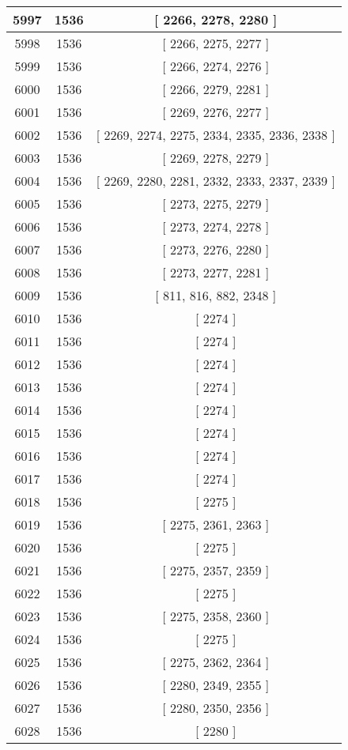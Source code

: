\begin{center}
\begin{longtable}[H]{|| c c c ||}
\hline
5997 & 1536 & [ 2266, 2278, 2280 ] \\ 
\hline
5998 & 1536 & [ 2266, 2275, 2277 ] \\ 
\hline
5999 & 1536 & [ 2266, 2274, 2276 ] \\ 
\hline
6000 & 1536 & [ 2266, 2279, 2281 ] \\ 
\hline
6001 & 1536 & [ 2269, 2276, 2277 ] \\ 
\hline
6002 & 1536 & [ 2269, 2274, 2275, 2334, 2335, 2336, 2338 ] \\ 
\hline
6003 & 1536 & [ 2269, 2278, 2279 ] \\ 
\hline
6004 & 1536 & [ 2269, 2280, 2281, 2332, 2333, 2337, 2339 ] \\ 
\hline
6005 & 1536 & [ 2273, 2275, 2279 ] \\ 
\hline
6006 & 1536 & [ 2273, 2274, 2278 ] \\ 
\hline
6007 & 1536 & [ 2273, 2276, 2280 ] \\ 
\hline
6008 & 1536 & [ 2273, 2277, 2281 ] \\ 
\hline
6009 & 1536 & [ 811, 816, 882, 2348 ] \\ 
\hline
6010 & 1536 & [ 2274 ] \\ 
\hline
6011 & 1536 & [ 2274 ] \\ 
\hline
6012 & 1536 & [ 2274 ] \\ 
\hline
6013 & 1536 & [ 2274 ] \\ 
\hline
6014 & 1536 & [ 2274 ] \\ 
\hline
6015 & 1536 & [ 2274 ] \\ 
\hline
6016 & 1536 & [ 2274 ] \\ 
\hline
6017 & 1536 & [ 2274 ] \\ 
\hline
6018 & 1536 & [ 2275 ] \\ 
\hline
6019 & 1536 & [ 2275, 2361, 2363 ] \\ 
\hline
6020 & 1536 & [ 2275 ] \\ 
\hline
6021 & 1536 & [ 2275, 2357, 2359 ] \\ 
\hline
6022 & 1536 & [ 2275 ] \\ 
\hline
6023 & 1536 & [ 2275, 2358, 2360 ] \\ 
\hline
6024 & 1536 & [ 2275 ] \\ 
\hline
6025 & 1536 & [ 2275, 2362, 2364 ] \\ 
\hline
6026 & 1536 & [ 2280, 2349, 2355 ] \\ 
\hline
6027 & 1536 & [ 2280, 2350, 2356 ] \\ 
\hline
6028 & 1536 & [ 2280 ] \\ 

\end{longtable}
\end{center}
